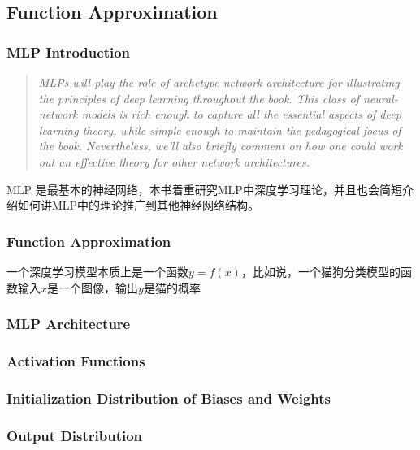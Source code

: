 \subsection{Function Approximation}

\subsubsection{MLP Introduction}
\begin{quote}
    \textit{MLPs will play the role of archetype network architecture for illustrating the principles of deep learning throughout the book. This class of neural-network models is rich enough to capture all the essential aspects of deep learning theory, while simple enough to maintain the pedagogical focus of the book. Nevertheless, we'll also briefly comment on how one could work out an effective theory for other network architectures.}

\end{quote}
MLP 是最基本的神经网络，本书着重研究MLP中深度学习理论，并且也会简短介绍如何讲MLP中的理论推广到其他神经网络结构。

\subsubsection{Function Approximation}
一个深度学习模型本质上是一个函数$y=f(x)$，比如说，一个猫狗分类模型的函数输入$x$是一个图像，输出$y$是猫的概率

\subsubsection{MLP Architecture}

\subsubsection{Activation Functions}

\subsubsection{Initialization Distribution of Biases and Weights}

\subsubsection{Output Distribution}
